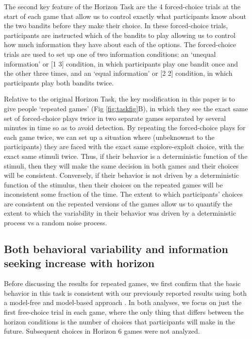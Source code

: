 \documentclass[12pt]{article}
\begin{document}
{	The second key feature of the Horizon Task are the 4 forced-choice trials at the start of each game that allow us to control exactly what participants know about the two bandits before they make their choice. In these forced-choice trials, participants are instructed which of the bandits to play allowing us to control how much information they have about each of the options. The forced-choice trials are used to set up one of two information conditions: an `unequal information' or [1 3] condition, in which participants play one bandit once and the other three times, and an `equal information' or [2 2] condition, in which participants play both bandits twice.
	
	Relative to the original Horizon Task, the key modification in this paper is to give people `repeated games' (Fig \ref{fig:taskfig}B), in which they see the exact same set of forced-choice plays twice in two separate games separated by several minutes in time so as to avoid detection. By repeating the forced-choice plays for each game twice, we can set up a situation where (unbeknownst to the participants) they are faced with the exact same explore-exploit choice, with the exact same stimuli twice. Thus, if their behavior is a deterministic function of the stimuli, then they will make the same decision in both games and their choices will be consistent. Conversely, if their behavior is not driven by a deterministic function of the stimulus, then their choices on the repeated games will be inconsistent some fraction of the time. The extent to which participants' choices are consistent on the repeated versions of the games allow us to quantify the extent to which the variability in their behavior was driven by a deterministic process vs a random noise process.
	
	\subsection*{Both behavioral variability and information seeking increase with horizon}
	Before discussing the results for repeated games, we first confirm that the basic behavior in this task is consistent with our previously reported results using both a model-free and model-based approach \citep{wilson2014}. In both analyses, we focus on just the first free-choice trial in each game, where the only thing that differs between the horizon conditions is the number of choices that participants will make in the future. Subsequent choices in Horizon 6 games were not analyzed.
	
}
\end{document}
